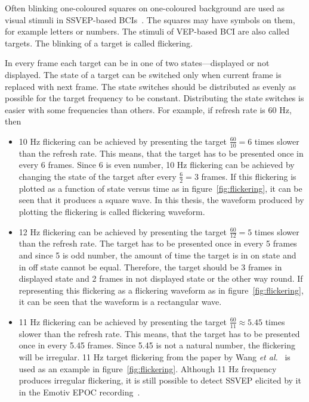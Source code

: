 Often blinking one-coloured squares on one-coloured background are used as visual stimuli in \gls{SSVEP}-based \glspl{BCI}~\cite{ssvep_stim}. The squares may have symbols on them, for example letters or numbers. The stimuli of \gls{VEP}-based \gls{BCI} are also called \glspl{target}. The blinking of a target is called \gls{flickering}.

In every \gls{frame} each \gls{target} can be in one of two \glspl{state}---displayed or not displayed. The \gls{state} of a \gls{target} can be switched only when current \gls{frame} is replaced with next \gls{frame}. The \gls{state} switches should be distributed as evenly as possible for the target frequency to be constant. Distributing the \gls{state} switches is easier with some frequencies than others. For example, if \gls{refresh rate} is 60 Hz, then
\begin{itemize}
	\item 10 Hz \gls{flickering} can be achieved by presenting the \gls{target} $\frac{60}{10}=6$ times slower than the \gls{refresh rate}. This means, that the \gls{target} has to be presented once in every 6 \glspl{frame}. Since 6 is even number, 10 Hz \gls{flickering} can be achieved by changing the \gls{state} of the \gls{target} after every $\frac{6}{2} = 3$ \glspl{frame}. If this \gls{flickering} is plotted as a function of \gls{state} versus time as in figure~\ref{fig:flickering}, it can be seen that it produces a \gls{square wave}. In this thesis, the waveform produced by plotting the \gls{flickering} is called \gls{flickering waveform}.
	\item 12 Hz \gls{flickering} can be achieved by presenting the \gls{target} $\frac{60}{12}=5$ times slower than the \gls{refresh rate}. The \gls{target} has to be presented once in every 5 \glspl{frame} and since 5 is odd number, the amount of time the target is in on \gls{state} and in off \gls{state} cannot be equal. Therefore, the \gls{target} should be 3 \glspl{frame} in displayed \gls{state} and 2 \glspl{frame} in not displayed \gls{state} or the other way round. If representing this \gls{flickering} as a \gls{flickering waveform} as in figure~\ref{fig:flickering}, it can be seen that the waveform is a \gls{rectangular wave}.
	\item 11 Hz \gls{flickering} can be achieved by presenting the \gls{target} $\frac{60}{11}\approx 5.45$ times slower than the \gls{refresh rate}. This means, that the \gls{target} has to be presented once in every 5.45 \glspl{frame}. Since 5.45 is not a natural number, the \gls{flickering} will be irregular. 11 Hz target \gls{flickering} from the paper by Wang \textit{et al.}~\cite{11hz} is used as an example in figure~\ref{fig:flickering}. Although 11 Hz frequency produces irregular \gls{flickering}, it is still possible to detect \gls{SSVEP} elicited by it in the Emotiv EPOC recording~\cite{emotiv_11hz}.
\end{itemize}

